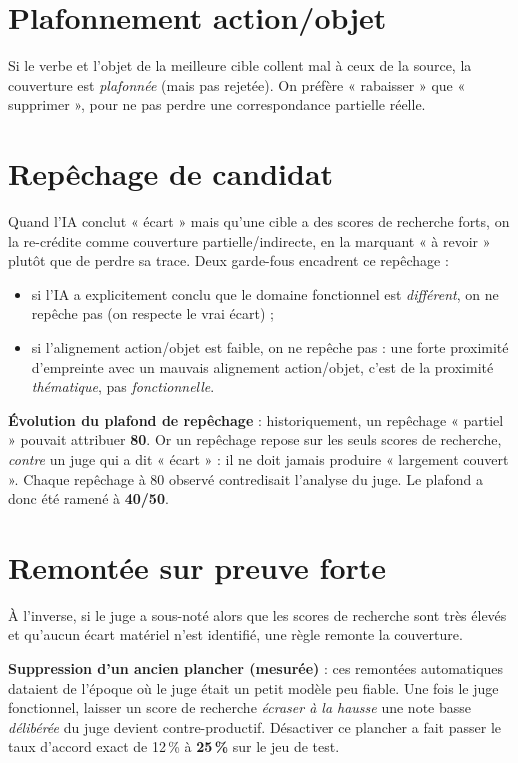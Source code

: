 \documentclass[11pt,a4paper]{report}
\newcommand{\code}[1]{\texttt{\detokenize{#1}}}
\begin{document}
\section{Plafonnement action/objet}
Si le verbe et l'objet de la meilleure cible collent mal à ceux de la source, la couverture est \emph{plafonnée} (mais pas rejetée). On préfère « rabaisser » que « supprimer », pour ne pas perdre une correspondance partielle réelle.

\section{Repêchage de candidat}
\label{sec:rescue}
Quand l'IA conclut « écart » mais qu'une cible a des scores de recherche forts, on la re-crédite comme couverture partielle/indirecte, en la marquant « à revoir » plutôt que de perdre sa trace. Deux garde-fous encadrent ce repêchage :
\begin{itemize}[nosep]
  \item si l'IA a explicitement conclu que le domaine fonctionnel est \emph{différent}, on ne repêche pas (on respecte le vrai écart) ;
  \item si l'alignement action/objet est faible, on ne repêche pas : une forte proximité d'empreinte avec un mauvais alignement action/objet, c'est de la proximité \emph{thématique}, pas \emph{fonctionnelle}.
\end{itemize}

\begin{motiv}
\textbf{Évolution du plafond de repêchage} : historiquement, un repêchage « partiel » pouvait attribuer \textbf{80}. Or un repêchage repose sur les seuls scores de recherche, \emph{contre} un juge qui a dit « écart » : il ne doit jamais produire « largement couvert ». Chaque repêchage à 80 observé contredisait l'analyse du juge. Le plafond a donc été ramené à \textbf{40/50}.
\end{motiv}

\section{Remontée sur preuve forte}
À l'inverse, si le juge a sous-noté alors que les scores de recherche sont très élevés et qu'aucun écart matériel n'est identifié, une règle remonte la couverture.

\begin{motiv}
\textbf{Suppression d'un ancien plancher (mesurée)} : ces remontées automatiques dataient de l'époque où le juge était un petit modèle peu fiable. Une fois le juge \code{gpt-5.4} fonctionnel, laisser un score de recherche \emph{écraser à la hausse} une note basse \emph{délibérée} du juge devient contre-productif. Désactiver ce plancher a fait passer le taux d'accord exact de 12\,\% à \textbf{25\,\%} sur le jeu de test.
\end{motiv}
\end{document}
